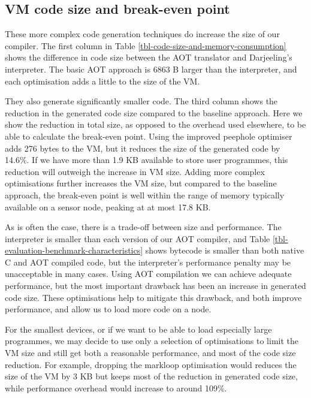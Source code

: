 \subsection{VM code size and break-even point}
\label{sec-code-size-break-even}
These more complex code generation techniques do increase the size of our compiler. The first column in Table \ref{tbl-code-size-and-memory-consumption} shows the difference in code size between the AOT translator and Darjeeling's interpreter. The basic AOT approach is 6863 B larger than the interpreter, and each optimisation adds a little to the size of the VM.

They also generate significantly smaller code. The third column shows the reduction in the generated code size compared to the baseline approach. Here we show the reduction in total size, as opposed to the overhead used elsewhere, to be able to calculate the break-even point. Using the improved peephole optimiser adds 276 bytes to the VM, but it reduces the size of the generated code by 14.6\%. If we have more than 1.9 KB available to store user programmes, this reduction will outweigh the increase in VM size. Adding more complex optimisations further increases the VM size, but compared to the baseline approach, the break-even point is well within the range of memory typically available on a sensor node, peaking at at most 17.8 KB.

As is often the case, there is a trade-off between size and performance. The interpreter is smaller than each version of our AOT compiler, and Table \ref{tbl-evaluation-benchmark-characteristics} shows bytecode is smaller than both native C and AOT compiled code, but the interpreter's performance penalty may be unacceptable in many cases. Using AOT compilation we can achieve adequate performance, but the most important drawback has been an increase in generated code size. These optimisations help to mitigate this drawback, and both improve performance, and allow us to load more code on a node.

For the smallest devices, or if we want to be able to load especially large programmes, we may decide to use only a selection of optimisations to limit the VM size and still get both a reasonable performance, and most of the code size reduction. For example, dropping the markloop optimisation would reduces the size of the VM by 3 KB but keeps most of the reduction in generated code size, while performance overhead would increase to around 109\%.



